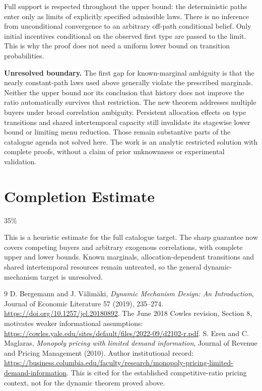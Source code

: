 \documentclass[11pt]{article}
\theoremstyle{remark}\newtheorem{remark}[theorem]{Remark}
\begin{document}
Full support is respected throughout the upper bound: the deterministic paths enter only as limits of explicitly specified admissible laws. There is no inference from unconditional convergence to an arbitrary off-path conditional belief. Only initial incentives conditional on the observed first type are passed to the limit. This is why the proof does not need a uniform lower bound on transition probabilities.

\textbf{Unresolved boundary.} The first gap for known-marginal ambiguity is that the nearly constant-path laws used above generally violate the prescribed marginals. Neither the upper bound nor its conclusion that history does not improve the ratio automatically survives that restriction. The new theorem addresses multiple buyers under broad correlation ambiguity. Persistent allocation effects on type transitions and shared intertemporal capacity still invalidate its stagewise lower bound or limiting menu reduction. Those remain substantive parts of the catalogue agenda not solved here. The work is an analytic restricted solution with complete proofs, without a claim of prior unknownness or experimental validation.

\section{Completion Estimate}
35\%

This is a heuristic estimate for the full catalogue target.
The sharp guarantee now covers competing buyers and arbitrary exogenous correlations, with complete upper and lower bounds. Known marginals, allocation-dependent transitions and shared intertemporal resources remain untreated, so the general dynamic-mechanism target is unresolved.

\begin{thebibliography}{9}
 D. Bergemann and J. V\"alim\"aki, \emph{Dynamic Mechanism Design: An Introduction}, Journal of Economic Literature 57 (2019), 235--274. \url{https://doi.org/10.1257/jel.20180892}. The June 2018 Cowles revision, Section 8, motivates weaker informational assumptions: \url{https://cowles.yale.edu/sites/default/files/2022-09/d2102-r.pdf}.
 S. Eren and C. Maglaras, \emph{Monopoly pricing with limited demand information}, Journal of Revenue and Pricing Management (2010). Author institutional record: \url{https://business.columbia.edu/faculty/research/monopoly-pricing-limited-demand-information}. This is cited for the established competitive-ratio pricing context, not for the dynamic theorem proved above.
\end{thebibliography}
\end{document}
